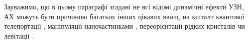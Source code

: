 










Зауважимо, що в цьому параграфі згадані не всі відомі динамічні ефекти УЗН,
АХ можуть бути причиною багатьох інших цікавих явищ, на кшталт квантової телепортації \cite{Buscemi}, маніпуляції наночастинками \cite{Cuberes,Olikh:SPQEO2010}, переорієнтації рідких кристалів \cite{US:levit} чи левітації \cite{US:levit}.

